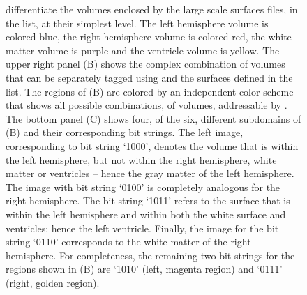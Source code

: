 \begin{figure}[t]
{	differentiate the volumes enclosed by the large scale surfaces 
	files, in the  list, at their simplest level.  
	The left hemisphere volume is colored blue, the right hemisphere volume 
	is colored red, the white matter volume is purple and the ventricle 
	volume is yellow.  The upper right panel (B) shows the complex 
	combination of volumes that can be separately tagged using 
	 and the surfaces defined in the 
	 list.  The regions of (B) are colored by an 
	independent color scheme that shows all possible combinations, of 
	volumes, addressable by .  The bottom panel (C) 
	shows four, of the six, different subdomains of (B) and their corresponding bit 
	strings. The left image, corresponding to bit string `1000', denotes 
	the volume that is within the left hemisphere, but not within the right 
	hemisphere, white matter or ventricles -- hence the gray matter of the 
	left hemisphere.  The image with bit string `0100' is completely 
	analogous for the right hemisphere. The bit string `1011' refers to the 
	surface that is within the left hemisphere and within both the white 
	surface and ventricles; hence the left ventricle. Finally, the image 
	for the bit string `0110' corresponds to the white matter of the right 
	hemisphere. For completeness, the remaining two bit strings for the 
	regions shown in (B) are `1010' (left, magenta region) and `0111' 
	(right, golden region).}
\label{fig:chp4:smap-example}
\end{figure}

